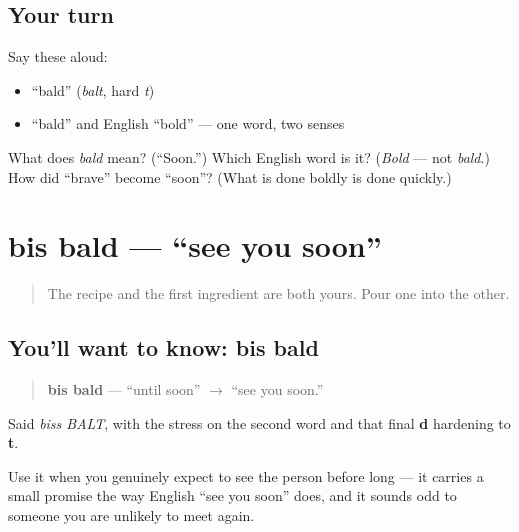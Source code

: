 \subsection*{Your turn}
Say these aloud:

\begin{itemize}
\raggedright
  \item \textquotedblleft{}bald\textquotedblright{} (\emph{balt}, hard \emph{t})
  \item \textquotedblleft{}bald\textquotedblright{} and English \textquotedblleft{}bold\textquotedblright{} — one word, two senses
\end{itemize}

\begin{tcolorbox}[breakable,colback=teal!4,colframe=teal!35!black,title={Before you move on}]
What does \emph{bald} mean? (\textquotedblleft{}Soon.\textquotedblright{}) Which English word is it? (\emph{Bold} — not \emph{bald}.) How did \textquotedblleft{}brave\textquotedblright{} become \textquotedblleft{}soon\textquotedblright{}? (What is done boldly is done quickly.)
\end{tcolorbox}
\section[bis bald]{bis bald — \textquotedblleft{}see you soon\textquotedblright{}}

\label{lesson:GE-C04-bis-bald}



\begin{quote}
The recipe and the first ingredient are both yours. Pour one into the other.
\end{quote}

\subsection*{You'll want to know: bis bald}
\begin{quote}
\textbf{bis bald} — \textquotedblleft{}until soon\textquotedblright{} $\to$ \textquotedblleft{}see you soon.\textquotedblright{}
\end{quote}

Said \emph{biss BALT}, with the stress on the second word and that final \textbf{d} hardening to \textbf{t}.

Use it when you genuinely expect to see the person before long — it carries a small promise the way English \textquotedblleft{}see you soon\textquotedblright{} does, and it sounds odd to someone you are unlikely to meet again.

